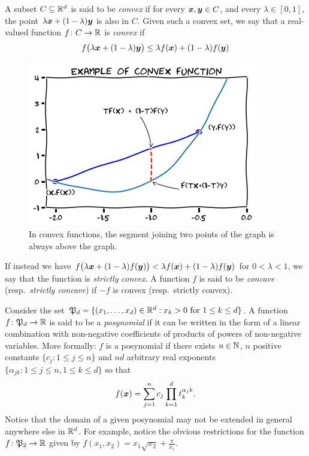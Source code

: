 \begin{example}\label{example:convexFunction}
A subset $C \subseteq \mathbb{R}^d$ is said to be \emph{convex} if for every $\boldsymbol{x}, \boldsymbol{y} \in C$, and every $\lambda \in [0,1]$, the point $\lambda \boldsymbol{x} + (1-\lambda) \boldsymbol{y}$ is also in $C$.   Given such a convex set, we say that a real-valued function $f \colon C \to \mathbb{R}$ is \emph{convex} if 
\begin{equation*}
f\big(\lambda \boldsymbol{x} + (1-\lambda)\boldsymbol{y}\big) \leq \lambda f(\boldsymbol{x}) + (1-\lambda) f(\boldsymbol{y})
\end{equation*}
\begin{figure}[ht!]
\includegraphics[width=0.5\linewidth]{convexFunction.png}
\caption{In convex functions, the segment joining two points of the graph is always above the graph.}
\label{figure:convexFunction}
\end{figure}
If instead we have $f\big(\lambda \boldsymbol{x} + (1-\lambda)f(\boldsymbol{y})\big) < \lambda f(\boldsymbol{x}) + (1-\lambda) f(\boldsymbol{y})$ for $0<\lambda<1$, we say that the function is \emph{strictly convex}.  A function $f$ is said to be \emph{concave} (resp.~\emph{strictly concave}) if $-f$ is convex (resp.~strictly convex).
\end{example}

\begin{example}[Posynomials]\label{example:posynomial}
Consider the set $\mathfrak{P}_d = \{ (x_1, \dotsc, x_d) \in \mathbb{R}^d : x_k > 0 \text{ for } 1\leq k \leq d\}$. A function $f \colon \mathfrak{P}_d \to \mathbb{R}$ is said to be a \emph{posynomial} if it can be written in the form of a linear combination with non-negative coefficients of products of powers of non-negative variables.  More formally: $f$ is a posynomial if there exists $n \in \mathbb{N}$, $n$ positive constants $\{ c_j : 1 \leq j \leq n \}$ and $nd$ arbitrary real exponents $\{ \alpha_{jk} : 1\leq j \leq n, 1 \leq k \leq d \}$ so that 
\begin{equation*}
f(\boldsymbol{x}) = \sum_{j=1}^n c_j \prod_{k=1}^d t_k^{\alpha_jk}.
\end{equation*}
Notice that the domain of a given posynomial may not be extended in general anywhere else in $\mathbb{R}^d$.  For example, notice the obvious restrictions for the function $f\colon \mathfrak{P}_2 \to \mathbb{R}$ given by $f(x_1,x_2) = x_1\sqrt{x_2} + \frac{\pi}{x_1}$.
\end{example}


